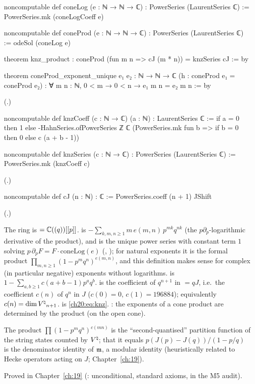 \begin{leancode}
noncomputable def coneLog (e : ℕ → ℕ → ℂ) : PowerSeries (LaurentSeries ℂ) :=
  PowerSeries.mk (coneLogCoeff e)

noncomputable def coneProd (e : ℕ → ℕ → ℂ) : PowerSeries (LaurentSeries ℂ) :=
  odeSol (coneLog e)

theorem knz_product : coneProd (fun m n => cJ (m * n)) = knzSeries cJ := by

theorem coneProd_exponent_unique {e₁ e₂ : ℕ → ℕ → ℂ} (h : coneProd e₁ = coneProd e₂) :
    ∀ m n : ℕ, 0 < m → 0 < n → e₁ m n = e₂ m n := by
\end{leancode}
(.)
\begin{leancode}
noncomputable def knzCoeff (c : ℕ → ℂ) (a : ℕ) : LaurentSeries ℂ :=
  if a = 0 then 1 else
    -HahnSeries.ofPowerSeries ℤ ℂ (PowerSeries.mk fun b => if b = 0 then 0 else c (a + b - 1))

noncomputable def knzSeries (c : ℕ → ℂ) : PowerSeries (LaurentSeries ℂ) :=
  PowerSeries.mk (knzCoeff c)
\end{leancode}
(.)
\begin{leancode}
noncomputable def cJ (n : ℕ) : ℂ := PowerSeries.coeff (n + 1) JShift
\end{leancode}
(.)
\begin{dictionary}
The ring is  $={\mathbb{C}}((q))[[p]]$.   is
$-\sum_{k,m,n\ge1}m\,e(m,n)\,p^{mk}q^{nk}$ (the $p\partial_p$-logarithmic derivative of the product), and 
is the unique power series with constant term $1$ solving $p\,\partial_pF=F\cdot\mathrm{coneLog}(e)$ (,
); for natural exponents it is the formal product $\prod_{m,n\ge1}(1-p^mq^n)^{e(m,n)}$, and this
definition makes sense for complex (in particular negative) exponents without logarithms.   is
$1-\sum_{a,b\ge1}c(a+b-1)p^aq^b$.   is the coefficient of $q^{n+1}$ in  $=qJ$, i.e.\ the coefficient
$c(n)$ of $q^n$ in $J$ ($c(0)=0$, $c(1)=196884$); equivalently $c(n)=\dim{V^{\natural}}_{n+1}$.   is
\eqref{ch20:eq:knz}.  : the exponents of a cone product are determined by the product (on the
open cone).
\end{dictionary}
\begin{physics}
The product $\prod(1-p^mq^n)^{c(mn)}$ is the ``second-quantised'' partition function of the string states counted by
${V^{\natural}}$; that it equals $p(J(p)-J(q))/(1-p/q)$ is the denominator identity of $\mathfrak m$, a modular identity
(heuristically related to Hecke operators acting on $J$; Chapter~\ref{ch:19}).
\end{physics}
\begin{status}
Proved in Chapter~\ref{ch:19} (: unconditional, standard axioms, in the M5 audit).
\end{status}

